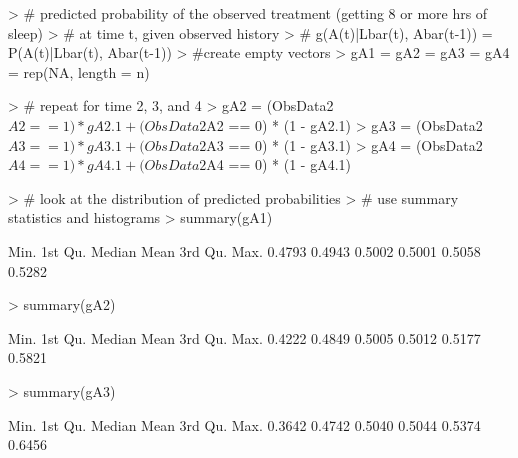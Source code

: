 \documentclass[answers]{exam}
\begin{document}
\begin{enumerate}
\begin{solution}
\begin{Schunk}
\begin{Sinput}
> # predicted probability of the observed treatment (getting 8 or more hrs of sleep) 
> # at time t, given observed history
> # g(A(t)|Lbar(t), Abar(t-1)) = P(A(t)|Lbar(t), Abar(t-1))
> #create empty vectors
> gA1 = gA2 = gA3 = gA4 = rep(NA, length = n)
\end{Sinput}
\end{Schunk}
\begin{Schunk}
\end{Schunk}
\begin{Schunk}
\begin{Sinput}
> # repeat for time 2, 3, and 4
> gA2 = (ObsData2$A2 == 1) * gA2.1 + (ObsData2$A2 == 0) * (1 - gA2.1)
> gA3 = (ObsData2$A3 == 1) * gA3.1 + (ObsData2$A3 == 0) * (1 - gA3.1)
> gA4 = (ObsData2$A4 == 1) * gA4.1 + (ObsData2$A4 == 0) * (1 - gA4.1)
\end{Sinput}
\end{Schunk}
\begin{Schunk}
\begin{Sinput}
> # look at the distribution of predicted probabilities 
> # use summary statistics and histograms
> summary(gA1)
\end{Sinput}
\begin{Soutput}
   Min. 1st Qu.  Median    Mean 3rd Qu.    Max. 
 0.4793  0.4943  0.5002  0.5001  0.5058  0.5282 
\end{Soutput}
\begin{Sinput}
> summary(gA2)
\end{Sinput}
\begin{Soutput}
   Min. 1st Qu.  Median    Mean 3rd Qu.    Max. 
 0.4222  0.4849  0.5005  0.5012  0.5177  0.5821 
\end{Soutput}
\begin{Sinput}
> summary(gA3)
\end{Sinput}
\begin{Soutput}
   Min. 1st Qu.  Median    Mean 3rd Qu.    Max. 
 0.3642  0.4742  0.5040  0.5044  0.5374  0.6456 
\end{Soutput}
\begin{Sinput}

\end{Sinput}
\end{Schunk}
\end{solution}
\end{enumerate}
\end{document}
